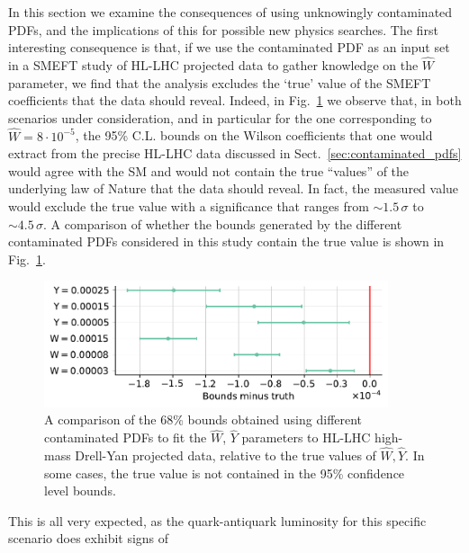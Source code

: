 \documentclass[withindex,glossary]{cam-thesis}
\begin{document}
In this section we examine the consequences of
using unknowingly contaminated PDFs, and the implications of this for possible new physics searches.
%
The first interesting consequence is that, if we use the contaminated PDF as an input set in a SMEFT study 
of HL-LHC projected data to gather knowledge on the $\hat{W}$ parameter, we find that the analysis excludes 
the `true' value of the SMEFT coefficients that the data should reveal.
%
Indeed, in Fig.~\ref{fig:bounds_comparison} we observe that, in both scenarios under consideration, and in particular for the one
corresponding to $\hat{W}=8\cdot10^{-5}$, the 95\% C.L. bounds on the Wilson coefficients that one would extract from the precise
HL-LHC data discussed in Sect.~\ref{sec:contaminated_pdfs} would agree with the SM and would not contain the true 
``values'' of the underlying law of Nature that the data should reveal.
In fact, the measured value would exclude the true value with a significance that ranges from  $\sim 1.5 \, \sigma$ to $\sim 4.5 \, \sigma$. A comparison of whether the bounds generated by the different contaminated PDFs considered in this study contain the true value is shown in Fig.~\ref{fig:bounds_comparison}.
%
\begin{figure}[H]
\centering
\includegraphics[width=0.9\textwidth]{Figures/wy_bounds.pdf}
\caption{A comparison of the 68\% bounds obtained using different contaminated PDFs to fit the $\hat{W}$, $\hat{Y}$ parameters to HL-LHC high-mass Drell-Yan projected data, relative to the true values of $\hat{W}, \hat{Y}$. In some cases, the true value is not contained in the 95\% confidence level bounds.}
\label{fig:bounds_comparison}
\end{figure}
%
This is all very expected, as the quark-antiquark luminosity for this specific scenario does exhibit signs of
\end{document}
